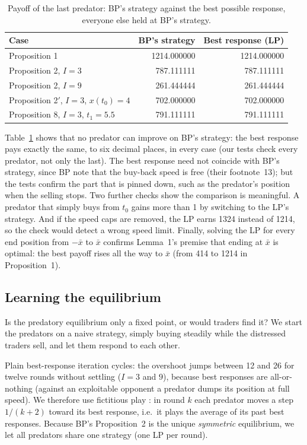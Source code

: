 \documentclass[11pt,a4paper]{article}
\newcommand{\xbar}{\bar x}
\begin{document}
\begin{table}[t]
  \centering\small
  \caption{Payoff of the last predator: BP's strategy against the best possible response,
  everyone else held at BP's strategy.}
  \label{tab:lp}
  \begin{tabular}{@{}lrr@{}}
    \toprule
    Case & BP's strategy & Best response (LP) \\
    \midrule
    Proposition 1 & 1214.000000 & 1214.000000 \\
    Proposition 2, $I = 3$ & 787.111111 & 787.111111 \\
    Proposition 2, $I = 9$ & 261.444444 & 261.444444 \\
    Proposition 2$'$, $I = 3$, $x(t_0) = 4$ & 702.000000 & 702.000000 \\
    Proposition 8, $I = 3$, $t_1 = 5.5$ & 791.111111 & 791.111111 \\
    \bottomrule
  \end{tabular}
\end{table}

Table~\ref{tab:lp} shows that no predator can improve on BP's strategy: the best response
pays exactly the same, to six decimal places, in every case (our tests check every predator,
not only the last). The best response need not coincide with BP's strategy, since BP note
that the buy-back speed is free (their footnote~13); but the tests confirm the part that is
pinned down, such as the predator's position when the selling stops. Two further checks
show the comparison is meaningful. A predator that simply buys from $t_0$ gains more than 1
by switching to the LP's strategy. And if the speed caps are removed, the LP earns 1324
instead of 1214, so the check would detect a wrong speed limit. Finally, solving the LP for
every end position from $-\xbar$ to $\xbar$ confirms Lemma~1's premise that ending at
$\xbar$ is optimal: the best payoff rises all the way to $\xbar$ (from 414 to 1214 in
Proposition~1).

\subsection{Learning the equilibrium}
Is the predatory equilibrium only a fixed point, or would traders find it? We start the
predators on a naive strategy, simply buying steadily while the distressed traders sell,
and let them respond to each other.

Plain best-response iteration cycles: the overshoot jumps between 12 and 26 for twelve rounds
without settling ($I = 3$ and $9$), because best responses are all-or-nothing (against an exploitable opponent
a predator dumps its position at full speed). We therefore use fictitious play
\cite{brown1951,robinson1951}: in round $k$ each predator moves a step $1/(k + 2)$ toward its
best response, i.e.\ it plays the average of its past best responses. Because BP's
Proposition~2 is the unique \emph{symmetric} equilibrium, we let all predators share one
strategy (one LP per round).
\end{document}
